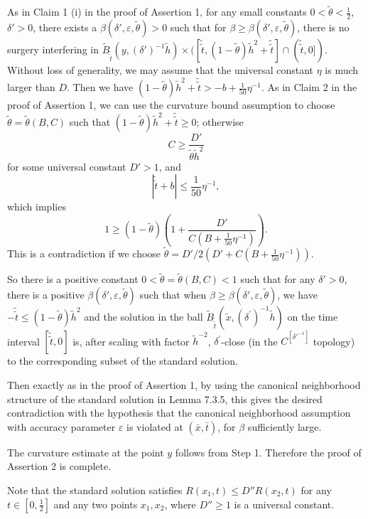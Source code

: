 As in Claim 1 (i) in the proof of Assertion 1, for any small
constants $0<\tilde{\theta}<\frac{1}{2}$, $\delta'>0$, there
exists a $\beta(\delta',\varepsilon, \tilde{\theta})> 0$ such that
for $\beta \geq \beta(\delta',\varepsilon, \tilde{\theta})$, there
is no surgery interfering in
$\widetilde{B}_{\tilde{\tilde{t}}}(y,(\delta')^{-1}\tilde{h})\times
([\tilde{\tilde{t}},(1-\tilde{\theta})\tilde{h}^{2}
+\tilde{\tilde{t}}]\cap(\tilde{\tilde{t}},0])$. Without loss of
generality, we may assume that the universal constant $\eta$ is
much larger than $D$. Then we have
$(1-\tilde{\theta})\tilde{h}^{2}
+\tilde{\tilde{t}}>-b+\frac{1}{50}\eta^{-1}$. As in Claim 2 in the
proof of Assertion 1, we can use the curvature bound assumption to
choose $\tilde{\theta}=\tilde{\theta}(B,C)$ such that
$(1-\tilde{\theta})\tilde{h}^{2} +\tilde{\tilde{t}}\geq 0$;
otherwise
$$
C\geq\frac{D'}{\tilde{\theta}\tilde{h}^{2}}
$$
for some universal constant $D'>1$, and
$$
|\tilde{\tilde{t}}+b|\leq \frac{1}{50}\eta^{-1},
$$
which implies
$$
1\geq(1-\tilde{\theta})\left(1+\frac{D'}{C\left(B+\frac{1}{50}\eta^{-1}\right)}\right).
$$
This is a contradiction if we choose
$\tilde{\theta}={D'}/{2(D'+C(B+\frac{1}{50}\eta^{-1}))}$.

So there is a positive constant $0
<\tilde{\theta}=\tilde{\theta}(B,C)<1$ such that for any
$\delta'>0$, there is a positive $\beta(\delta',\varepsilon,
\tilde{\theta})$ such that when $\beta \geq
\beta(\delta',\varepsilon, \tilde{\theta})$, we have
$-\tilde{\tilde{t}}\leq (1-\tilde{\theta})\tilde{h}^{2}$  and the
solution in the ball $\widetilde{B}_{\tilde{\tilde{t}}}(\tilde{x},
{(\delta^{\prime})}^{-1}\tilde{h})$ on the time interval
$[\tilde{\tilde{t}},0]$ is, after scaling with factor
$\tilde{h}^{-2}$, ${\delta}^{\prime}$-close (in the
$C^{[\delta'^{-1}]}$ topology) to the corresponding subset of the
standard solution.

Then exactly as in the proof of Assertion 1, by using the
canonical neighborhood structure of the standard solution in Lemma
7.3.5, this gives the desired contradiction with the hypothesis
that the canonical neighborhood assumption with accuracy parameter
$\varepsilon$ is violated at $(\bar{x},\bar{t})$, for $\beta$
sufficiently large.

The curvature estimate at the point $y$ follows from Step 1.
Therefore the proof of Assertion 2 is complete.

Note that the standard solution satisfies $R(x_1,t)\leq D''
R(x_2,t)$ for any $t\in [0,\frac{1}{2}]$ and any two points
$x_1,x_2$, where $D''\geq 1$ is a universal constant.

